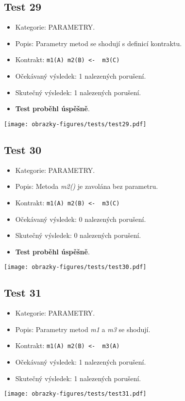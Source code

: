 \subsection*{Test 29}
\begin{itemize}
\item Kategorie: PARAMETRY.
\item Popis: Parametry metod se shodují s definicí kontraktu. 
\item Kontrakt: \texttt{m1(A) m2(B) <- { m3(C) }}
\item Očekávaný výsledek: 1 nalezených porušení.
\item Skutečný výsledek: 1 nalezených porušení.

\item \textbf{Test proběhl úspěšně}.
\end{itemize}
\begin{center}
    \centering
    \texttt{[image: obrazky-figures/tests/test29.pdf]}
    \label{test29}
\end{center}

\subsection*{Test 30}
\begin{itemize}
\item Kategorie: PARAMETRY.
\item Popis: Metoda \textit{m2()} je zavolána bez parametru. 
\item Kontrakt: \texttt{m1(A) m2(B) <- { m3(C) }}
\item Očekávaný výsledek: 0 nalezených porušení.
\item Skutečný výsledek: 0 nalezených porušení.

\item \textbf{Test proběhl úspěšně}.
\end{itemize}
\begin{center}
    \centering
    \texttt{[image: obrazky-figures/tests/test30.pdf]}
    \label{test30}
\end{center}

\subsection*{Test 31}
\begin{itemize}
\item Kategorie: PARAMETRY.
\item Popis: Parametry metod \textit{m1} a \textit{m3} se shodují. 
\item Kontrakt: \texttt{m1(A) m2(B) <- { m3(A) }}
\item Očekávaný výsledek: 1 nalezených porušení.
\item Skutečný výsledek: 1 nalezených porušení.

\end{itemize}
\begin{center}
    \centering
    \texttt{[image: obrazky-figures/tests/test31.pdf]}
    \label{test31}
\end{center}

